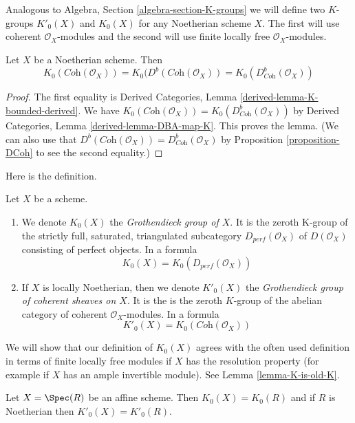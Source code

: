 \medskip\noindent
Analogous to Algebra, Section \ref{algebra-section-K-groups}
we will define two $K$-groups $K'_0(X)$ and $K_0(X)$ for any
Noetherian scheme $X$. The first will use coherent $\mathcal{O}_X$-modules
and the second will use finite locally free $\mathcal{O}_X$-modules.

\begin{lemma}
\label{lemma-Noetherian-Kprime}
Let $X$ be a Noetherian scheme. Then
$$
K_0(\textit{Coh}(\mathcal{O}_X)) =
K_0(D^b(\textit{Coh}(\mathcal{O}_X)) =
K_0(D^b_{\textit{Coh}}(\mathcal{O}_X))
$$
\end{lemma}

\begin{proof}
The first equality is
Derived Categories, Lemma \ref{derived-lemma-K-bounded-derived}.
We have $K_0(\textit{Coh}(\mathcal{O}_X)) =
K_0(D^b_{\textit{Coh}}(\mathcal{O}_X))$ by
Derived Categories, Lemma \ref{derived-lemma-DBA-map-K}.
This proves the lemma.
(We can also use that
$D^b(\textit{Coh}(\mathcal{O}_X)) = D^b_{\textit{Coh}}(\mathcal{O}_X)$
by Proposition \ref{proposition-DCoh} to see the second
equality.)
\end{proof}

\noindent
Here is the definition.

\begin{definition}
\label{definition-K-group}
Let $X$ be a scheme.
\begin{enumerate}
\item We denote $K_0(X)$ the {\it Grothendieck group of $X$}. It is the
zeroth K-group of the strictly full, saturated, triangulated subcategory
$D_{perf}(\mathcal{O}_X)$ of $D(\mathcal{O}_X)$ consisting of perfect objects.
In a formula
$$
K_0(X) = K_0(D_{perf}(\mathcal{O}_X))
$$
\item If $X$ is locally Noetherian, then we denote $K'_0(X)$ the
{\it Grothendieck group of coherent sheaves on $X$}. It is the
is the zeroth $K$-group of the abelian category
of coherent $\mathcal{O}_X$-modules. In a formula
$$
K'_0(X) = K_0(\textit{Coh}(\mathcal{O}_X))
$$
\end{enumerate}
\end{definition}

\noindent
We will show that our definition of $K_0(X)$ agrees with the often used
definition in terms of finite locally free modules if $X$ has the
resolution property (for example if $X$ has an ample invertible module).
See Lemma \ref{lemma-K-is-old-K}.

\begin{lemma}
\label{lemma-K-agrees-affine}
Let $X = \Spec(R)$ be an affine scheme. Then $K_0(X) = K_0(R)$
and if $R$ is Noetherian then $K'_0(X) = K'_0(R)$.
\end{lemma}

